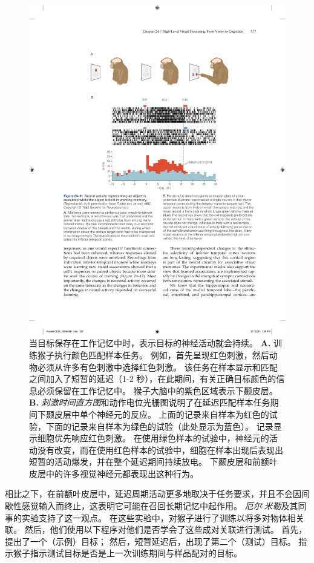 \begin{figure}[htbp]
	\centering
	\includegraphics[width=1.0\linewidth]{chap24/fig_24_11}
	\caption{当目标保存在工作记忆中时，表示目标的神经活动就会持续。 
		\textbf{A.} 训练猴子执行颜色匹配样本任务。
		例如，首先呈现红色刺激，然后动物必须从许多有色刺激中选择红色刺激。
		该任务在样本显示和匹配之间加入了短暂的延迟（1-2 秒），在此期间，有关正确目标颜色的信息必须保留在工作记忆中。
		猴子大脑中的紫色区域表示下颞皮层。
		\textbf{B.} \textit{刺激时间直方图}和动作电位光栅图说明了在延迟匹配样本任务期间下颞皮层中单个神经元的反应。
		上面的记录来自样本为红色的试验，下面的记录来自样本为绿色的试验（此处显示为蓝色）。
		记录显示细胞优先响应红色刺激。
		在使用绿色样本的试验中，神经元的活动没有改变，而在使用红色样本的试验中，细胞在样本出现后表现出短暂的活动爆发，并在整个延迟期间持续放电。
		下颞皮层和前额叶皮层中的许多视觉神经元都表现出这种行为。}
	\label{fig:24_11}
\end{figure}


相比之下，在前额叶皮层中，延迟周期活动更多地取决于任务要求，并且不会因间歇性感觉输入而终止，这表明它可能在召回长期记忆中起作用。
\textit{厄尔$\cdot$米勒}及其同事的实验支持了这一观点。
在这些实验中，对猴子进行了训练以将多对物体相关联。
然后，他们使用以下程序对他们是否学会了这些成对关联进行测试。
首先，提出了一个（示例）目标； 然后，短暂延迟后，出现了第二个（测试）目标。
指示猴子指示测试目标是否是上一次训练期间与样品配对的目标。


